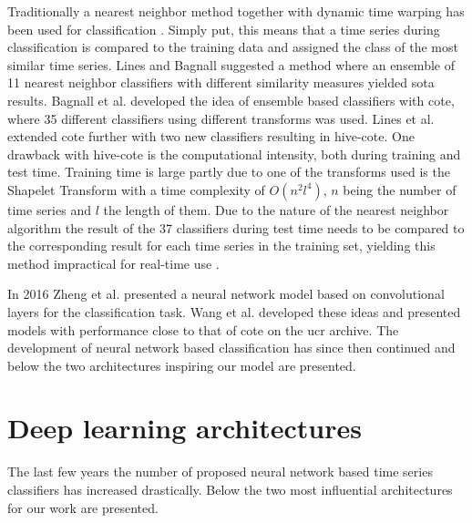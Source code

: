 Traditionally a nearest neighbor method together with dynamic time warping has been used for classification \cite{Bagnall2017}. Simply put, this means that a time series during classification is compared to the training data and assigned the class of the most similar time series. Lines and Bagnall suggested a method where an ensemble of 11 nearest neighbor classifiers with different similarity measures \cite{Lines2015} yielded \gls{sota} results. Bagnall et al. \cite{Bagnall2015} developed the idea of ensemble based classifiers with \gls{cote}, where 35 different classifiers using different transforms was used.
Lines et al. \cite{Lines2016} extended \gls{cote} further with two new classifiers resulting in \gls{hive-cote}. One drawback with \gls{hive-cote} is the computational intensity, both during training and test time. Training time is large partly due to one of the transforms used is the Shapelet Transform with a time complexity of $O(n^2l^4)$, $n$ being the number of time series and $l$ the length of them. Due to the nature of the nearest neighbor algorithm the result of the 37 classifiers during test time needs to be compared to the corresponding result for each time series in the training set, yielding this method impractical for real-time use \cite{IsmailFawaz2019}.

In 2016 Zheng et al. \cite{Zheng2016} presented a neural network model based on convolutional layers for the classification task. Wang et al. \cite{Wang2017} developed these ideas and presented models with performance close to that of \gls{cote} on the \gls{ucr} archive. The development of neural network based classification has since then continued and below the two architectures inspiring our model are presented.

\section{Deep learning architectures}
The last few years the number of proposed neural network based time series classifiers has increased drastically. Below the two most influential architectures for our work are presented.

